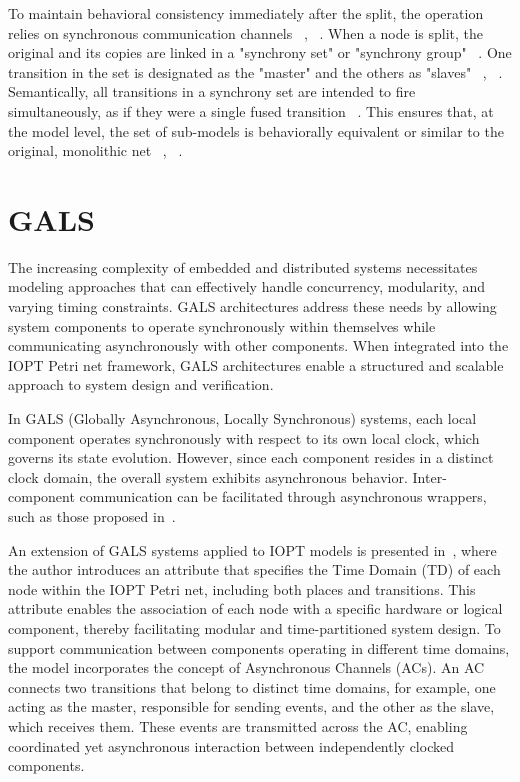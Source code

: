 \begin{itemize}
To maintain behavioral consistency immediately after the split, the operation relies on synchronous communication channels ~\cite{splitting}, ~\cite{co-design}. When a node is split, the original and its copies are linked in a "synchrony set" or "synchrony group" ~\cite{co-design}. One transition in the set is designated as the "master" and the others as "slaves" ~\cite{splitting}, ~\cite{co-design}. Semantically, all transitions in a synchrony set are intended to fire simultaneously, as if they were a single fused transition ~\cite{splitting}. This ensures that, at the model level, the set of sub-models is behaviorally equivalent or similar to the original, monolithic net ~\cite{splitting}, ~\cite{co-design}.

\end{itemize}



\section{GALS}
\label{sec:gals}


The increasing complexity of embedded and distributed systems necessitates modeling approaches that can effectively handle concurrency, modularity, and varying timing constraints. GALS architectures address these needs by allowing system components to operate synchronously within themselves while communicating asynchronously with other components. When integrated into the IOPT Petri net framework, GALS architectures enable a structured and scalable approach to system design and verification.

In GALS (Globally Asynchronous, Locally Synchronous) systems, each local component operates synchronously with respect to its own local clock, which governs its state evolution. However, since each component resides in a distinct clock domain, the overall system exhibits asynchronous behavior. Inter-component communication can be facilitated through asynchronous wrappers, such as those proposed in~\cite{galsborman}.


An extension of GALS systems applied to IOPT models is presented in~\cite{galsactd}, where the author introduces an attribute that specifies the Time Domain (TD) of each node within the IOPT Petri net, including both places and transitions. This attribute enables the association of each node with a specific hardware or logical component, thereby facilitating modular and time-partitioned system design.
To support communication between components operating in different time domains, the model incorporates the concept of Asynchronous Channels (ACs). An AC connects two transitions that belong to distinct time domains, for example, one acting as the master, responsible for sending events, and the other as the slave, which receives them. These events are transmitted across the AC, enabling coordinated yet asynchronous interaction between independently clocked components.


